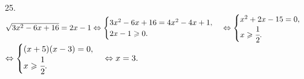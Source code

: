 25. $\sqrt{3x^2-6x+16}=2x-1\Leftrightarrow\begin{cases} 3x^2-6x+16=4x^2-4x+1,\\ 2x-1\geqslant0.\end{cases}
\Leftrightarrow\begin{cases} x^2+2x-15=0,\\ x\geqslant\cfrac{1}{2}.\end{cases}$\\$
\Leftrightarrow\begin{cases} (x+5)(x-3)=0,\\ x\geqslant\cfrac{1}{2}.\end{cases}
\Leftrightarrow x=3.$\\
